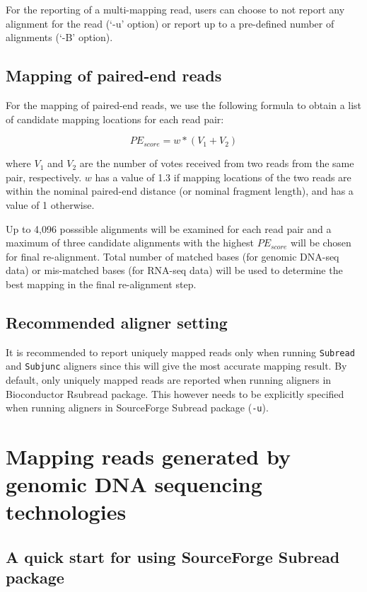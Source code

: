 \documentclass[12pt]{report}
\newcommand{\code}[1]{{\small\texttt{#1}}}
\newcommand{\Subread}{\textsf{Subread}}
\newcommand{\Rsubread}{\textsf{Rsubread}}
\begin{document}
For the reporting of a multi-mapping read, users can choose to not report any alignment for the read (`-u' option) or report up to a pre-defined number of alignments (`-B' option).


\section{Mapping of paired-end reads}

For the mapping of paired-end reads, we use the following formula to obtain a list of candidate mapping locations for each read pair:

$$PE_{score} = w * (V_1 + V_2) $$

where $V_1$ and $V_2$ are the number of votes received from two reads from the same pair, respectively.
$w$ has a value of 1.3 if mapping locations of the two reads are within the nominal paired-end distance (or nominal fragment length), and has a value of 1 otherwise.

Up to 4,096 posssible alignments will be examined for each read pair and a maximum of three candidate alignments with the highest $PE_{score}$ will be chosen for final re-alignment.
Total number of matched bases (for genomic DNA-seq data) or mis-matched bases (for RNA-seq data) will be used to determine the best mapping in the final re-alignment step.


\section{Recommended aligner setting}

It is recommended to report uniquely mapped reads only when running \code{Subread} and \code{Subjunc} aligners since this will give the most accurate mapping result.
By default, only uniquely mapped reads are reported when running aligners in Bioconductor {\Rsubread} package.
This however needs to be explicitly specified when running aligners in SourceForge {\Subread} package (\code{-u}).


\chapter{Mapping reads generated by genomic DNA sequencing technologies}
\label{chapter:subread-dnaseq}

\section{A quick start for using SourceForge {\Subread} package}
\end{document}
